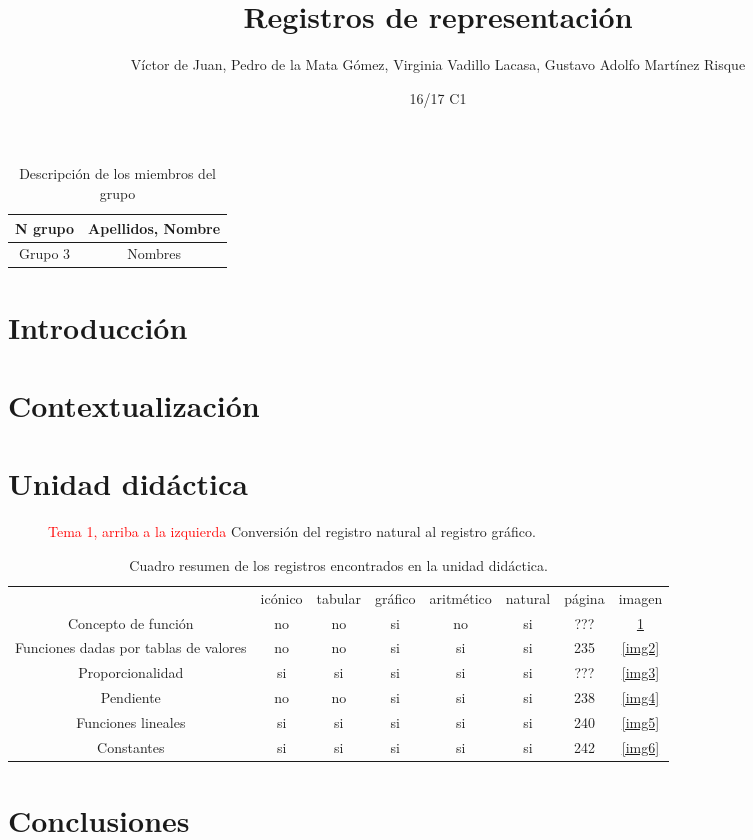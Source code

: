 \documentclass[palatino,nochap]{apuntesURJC}
\title{Registros de representación}
\author{Víctor de Juan,
Pedro de la Mata Gómez,
Virginia Vadillo Lacasa,
Gustavo Adolfo Martínez Risque}
\date{16/17 C1}
\begin{document}
\maketitle

\pagestyle{plain}

\begin{table}[hbtp]
\centering
\begin{tabular}{|c|c|}
\hline
N grupo & Apellidos, Nombre
\\\hline
Grupo 3 & Nombres
\\\hline
\end{tabular}
\caption{Descripción de los miembros del grupo}
\end{table}

\section{Introducción}
\section{Contextualización}

\section{Unidad didáctica}

\begin{figure}[hbtp]
\caption{\textcolor{red}{Tema 1, arriba a la izquierda} Conversión del registro natural al registro gráfico.}
\label{img1}
\end{figure}

\begin{table}[hbtp]
\begin{tabular}{cccccccc}
				&icónico & tabular & gráfico & aritmético & natural & página & imagen\\
Concepto de función & no & no & si & no & si & ??? & \ref{img1}\\
Funciones dadas por tablas de valores & no & no & si & si & si &235 & \ref{img2}\\
Proporcionalidad & si & si & si & si & si & ??? & \ref{img3}\\
Pendiente & no & no & si & si & si & 238 & \ref{img4}\\
Funciones lineales & si & si & si & si & si & 240 & \ref{img5} \\
Constantes & si & si & si & si & si & 242 & \ref{img6}\\
\end{tabular}
\caption{Cuadro resumen de los registros encontrados en la unidad didáctica.}
\label{Tablaresumen}
\end{table}


\section{Conclusiones}

\printindex


\end{document}
